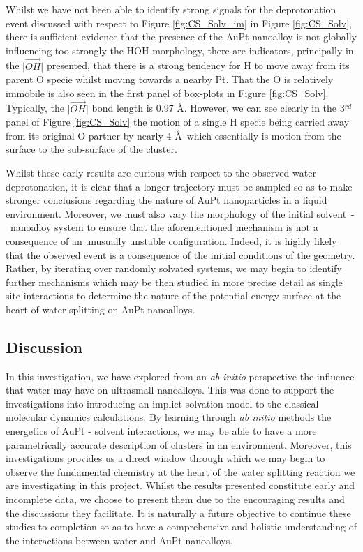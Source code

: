Whilst we have not been able to identify strong signals for the deprotonation event discussed with respect to Figure \ref{fig:CS_Solv_im} in Figure \ref{fig:CS_Solv}, there is sufficient evidence that the presence of the AuPt nanoalloy is not globally influencing too strongly the HOH morphology, there are indicators, principally in the $\vert\overrightarrow{OH}\vert$ presented, that there is a strong tendency for H to move away from its parent O specie whilst moving towards a nearby Pt. That the O is relatively immobile is also seen in the first panel of box-plots in Figure \ref{fig:CS_Solv}. Typically, the $\vert\overrightarrow{OH}\vert$ bond length is 0.97 \AA. However, we can see clearly in the 3$^{rd}$ panel of Figure \ref{fig:CS_Solv} the motion of a single H specie being carried away from its original O partner by nearly 4 \AA \ which essentially is motion from the surface to the sub-surface of the cluster.

Whilst these early results are curious with respect to the observed water deprotonation, it is clear that a longer trajectory must be sampled so as to make stronger conclusions regarding the nature of AuPt nanoparticles in a liquid environment. Moreover, we must also vary the morphology of the initial solvent~-~nanoalloy system to ensure that the aforementioned mechanism is not a consequence of an unusually unstable configuration. Indeed, it is highly likely that the observed event is a consequence of the initial conditions of the geometry. Rather, by iterating over randomly solvated systems, we may begin to identify further mechanisms which may be then studied in more precise detail as single site interactions to determine the nature of the potential energy surface at the heart of water splitting on AuPt nanoalloys.

\subsection{Discussion}

In this investigation, we have explored from an \textit{ab initio} perspective the influence that water may have on ultrasmall nanoalloys. This was done to support the investigations into introducing an implict solvation model to the classical molecular dynamics calculations. By learning through \textit{ab initio} methods the energetics of AuPt - solvent interactions, we may be able to have a more parametrically accurate description of clusters in an environment. Moreover, this investigations provides us a direct window through which we may begin to observe the fundamental chemistry at the heart of the water splitting reaction we are investigating in this project. Whilst the results presented constitute early and incomplete data, we choose to present them due to the encouraging results and the discussions they facilitate. It is naturally a future objective to continue these studies to completion so as to have a comprehensive and holistic understanding of the interactions between water and AuPt nanoalloys.

